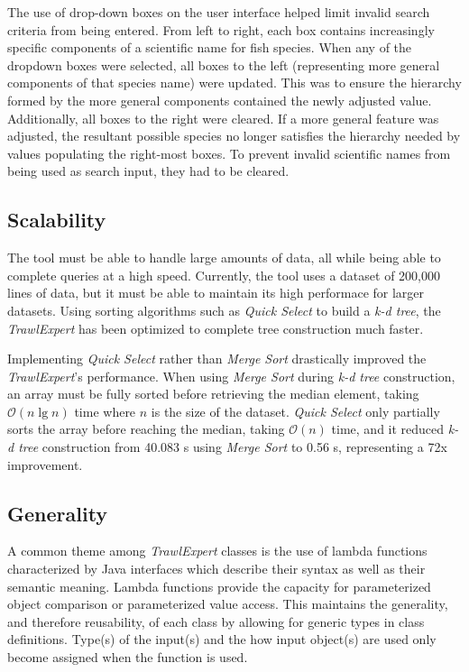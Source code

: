 \documentclass{article}
\begin{document}
The use of drop-down boxes on the user interface helped limit invalid search criteria from being entered. From left to right, each box contains increasingly specific components of a scientific name for fish species. When any of the dropdown boxes were selected, all boxes to the left (representing more general components of that species name) were updated. This was to ensure the hierarchy formed by the more general components contained the newly adjusted value. Additionally, all boxes to the right were cleared. If a more general feature was adjusted, the resultant possible species no longer satisfies the hierarchy needed by values populating the right-most boxes. To prevent invalid scientific names from being used as search input, they had to be cleared. 

\subsection{Scalability}
The tool must be able to handle large amounts of data, all while being able to complete queries at a high speed. Currently, the tool uses a dataset of 200,000 lines of data, but it must be able to maintain its high performace for larger datasets. Using sorting algorithms such as \textit{Quick Select} to build a \textit{k-d tree}, the \textit{TrawlExpert} has been optimized to complete tree construction much faster.

Implementing \textit{Quick Select} rather than \textit{Merge Sort} drastically improved the \textit{TrawlExpert}'s performance. When using \textit{Merge Sort} during \textit{k-d tree} construction, an array must be fully sorted before retrieving the median element, taking $\mathcal{O}(n\lg n)$ time where $n$ is the size of the dataset. \textit{Quick Select} only partially sorts the array before reaching the median, taking $\mathcal{O}(n)$ time, and it reduced \textit{k-d tree} construction from 40.083 s using \textit{Merge Sort} to 0.56 s, representing a 72x improvement. 

\subsection{Generality}
A common theme among \textit{TrawlExpert} classes is the use of lambda functions characterized by Java interfaces which describe their syntax as well as their semantic meaning. Lambda functions provide the capacity for parameterized object comparison or parameterized value access. This maintains the generality, and therefore reusability, of each class by allowing for generic types in class definitions. Type(s) of the input(s) and the how input object(s) are used only become assigned when the function is used.
\end{document}
